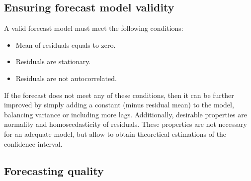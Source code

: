 \documentclass[12pt]{article}
\begin{document}
\subsection{Ensuring forecast model validity}
A valid forecast model must meet the following conditions:
\begin{itemize}
\item Mean of residuals equals to zero.
\item Residuals are stationary.
\item Residuals are not autocorrelated.
\end{itemize}
If the forecast does not meet any of these conditions, then it can be further improved by
 simply adding a constant (minus residual mean) to the model, balancing variance or including more lags. Additionally, desirable properties are normality and homoscedasticity of residuals. These properties are not necessary for an adequate model, but allow to obtain theoretical estimations of the confidence interval.

\subsection{Forecasting quality}
\end{document}
